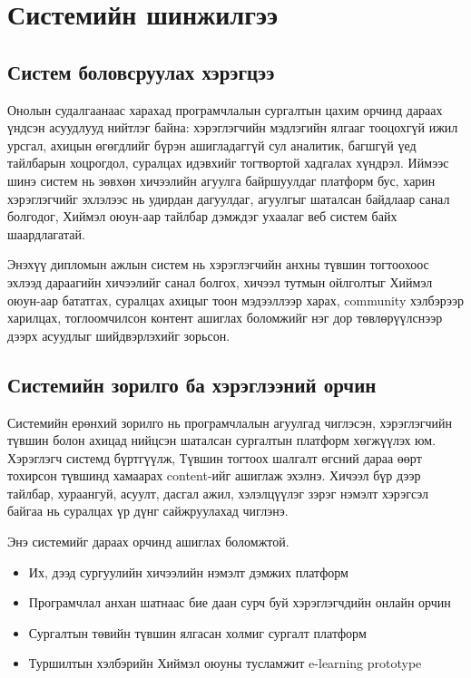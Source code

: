 
\chapter{Системийн шинжилгээ}
\label{Chapter2}

\section{Систем боловсруулах хэрэгцээ}
Онолын судалгаанаас харахад програмчлалын сургалтын цахим орчинд дараах үндсэн асуудлууд нийтлэг байна: хэрэглэгчийн мэдлэгийн ялгааг тооцохгүй ижил урсгал, ахицын өгөгдлийг бүрэн ашигладаггүй сул аналитик, багшгүй үед тайлбарын хоцрогдол, суралцах идэвхийг тогтвортой хадгалах хүндрэл. Иймээс шинэ систем нь зөвхөн хичээлийн агуулга байршуулдаг платформ бус, харин хэрэглэгчийг эхлэлээс нь удирдан дагуулдаг, агуулгыг шаталсан байдлаар санал болгодог, Хиймэл оюун-аар тайлбар дэмждэг ухаалаг веб систем байх шаардлагатай.

Энэхүү дипломын ажлын систем нь хэрэглэгчийн анхны түвшин тогтоохоос эхлээд дараагийн хичээлийг санал болгох, хичээл тутмын ойлголтыг Хиймэл оюун-аар бататгах, суралцах ахицыг тоон мэдээллээр харах, community хэлбэрээр харилцах, тоглоомчилсон контент ашиглах боломжийг нэг дор төвлөрүүлснээр дээрх асуудлыг шийдвэрлэхийг зорьсон.

\section{Системийн зорилго ба хэрэглээний орчин}
Системийн ерөнхий зорилго нь програмчлалын агуулгад чиглэсэн, хэрэглэгчийн түвшин болон ахицад нийцсэн шаталсан сургалтын платформ хөгжүүлэх юм. Хэрэглэгч системд бүртгүүлж, Түвшин тогтоох шалгалт өгсний дараа өөрт тохирсон түвшинд хамаарах content-ийг ашиглаж эхэлнэ. Хичээл бүр дээр тайлбар, хураангуй, асуулт, дасгал ажил, хэлэлцүүлэг зэрэг нэмэлт хэрэгсэл байгаа нь суралцах үр дүнг сайжруулахад чиглэнэ.

Энэ системийг дараах орчинд ашиглах боломжтой.
\begin{itemize}
\item Их, дээд сургуулийн хичээлийн нэмэлт дэмжих платформ
\item Програмчлал анхан шатнаас бие даан сурч буй хэрэглэгчдийн онлайн орчин
\item Сургалтын төвийн түвшин ялгасан холмиг сургалт платформ
\item Туршилтын хэлбэрийн Хиймэл оюуны тусламжит e-learning prototype
\end{itemize}

